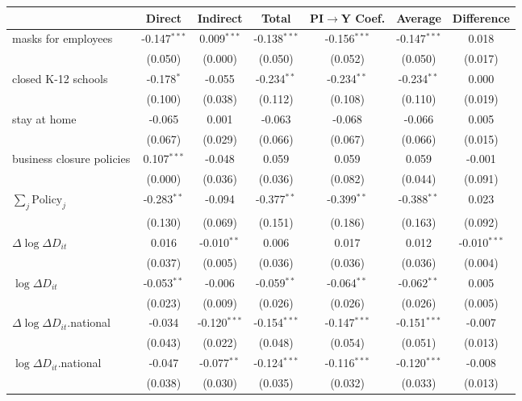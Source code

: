 
\begin{tabular}{lccccc|>{}c}
\toprule
  & Direct & Indirect & Total & PI$\to$Y Coef. & Average & Difference\\
\midrule
masks for employees & -0.147$^{***}$ & 0.009$^{***}$ & -0.138$^{***}$ & -0.156$^{***}$ & -0.147$^{***}$ & 0.018\\
 & (0.050) & (0.000) & (0.050) & (0.052) & (0.050) & (0.017)\\
closed K-12 schools & -0.178$^{*}$ & -0.055 & -0.234$^{**}$ & -0.234$^{**}$ & -0.234$^{**}$ & 0.000\\
 & (0.100) & (0.038) & (0.112) & (0.108) & (0.110) & (0.019)\\
stay at home & -0.065 & 0.001 & -0.063 & -0.068 & -0.066 & 0.005\\
 & (0.067) & (0.029) & (0.066) & (0.067) & (0.066) & (0.015)\\
business closure policies & 0.107$^{***}$ & -0.048 & 0.059 & 0.059 & 0.059 & -0.001\\
 & (0.000) & (0.036) & (0.036) & (0.082) & (0.044) & (0.091)\\
$\sum_j \mathrm{Policy}_j$ & -0.283$^{**}$ & -0.094 & -0.377$^{**}$ & -0.399$^{**}$ & -0.388$^{**}$ & 0.023\\
 & (0.130) & (0.069) & (0.151) & (0.186) & (0.163) & (0.092)\\
$\Delta \log \Delta D_{it}$ & 0.016 & -0.010$^{**}$ & 0.006 & 0.017 & 0.012 & -0.010$^{***}$\\
 & (0.037) & (0.005) & (0.036) & (0.036) & (0.036) & (0.004)\\
$\log \Delta D_{it}$ & -0.053$^{**}$ & -0.006 & -0.059$^{**}$ & -0.064$^{**}$ & -0.062$^{**}$ & 0.005\\
 & (0.023) & (0.009) & (0.026) & (0.026) & (0.026) & (0.005)\\
$\Delta \log \Delta D_{it}$.national & -0.034 & -0.120$^{***}$ & -0.154$^{***}$ & -0.147$^{***}$ & -0.151$^{***}$ & -0.007\\
 & (0.043) & (0.022) & (0.048) & (0.054) & (0.051) & (0.013)\\
$\log \Delta D_{it}$.national & -0.047 & -0.077$^{**}$ & -0.124$^{***}$ & -0.116$^{***}$ & -0.120$^{***}$ & -0.008\\
 & (0.038) & (0.030) & (0.035) & (0.032) & (0.033) & (0.013)\\
\bottomrule
\end{tabular}